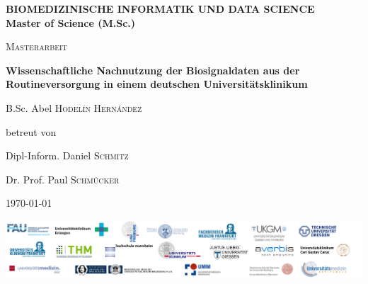 \begin{titlepage}
	\thispagestyle{firstpage}
	\raggedright
	{
		{\normalsize \color{orange} \bfseries BIOMEDIZINISCHE INFORMATIK UND DATA SCIENCE  \\}
		{\normalsize \color{gray} \bfseries Master of Science (M.Sc.)}
		\par
	}
	
	\vspace{1cm}
	
	\centering
	{\scshape\LARGE Masterarbeit \par}
	
	\vspace{1.5cm}
	{\huge \bfseries Wissenschaftliche Nachnutzung der Biosignaldaten aus der Routineversorgung in einem deutschen Universitätsklinikum \par}
	
	\vspace{2cm}
	{\Large B.Sc. Abel \textsc{Hodel\'in Hern\'andez}~\par}
	\vspace{2cm} 
	betreut von\par
	{Dipl-Inform. Daniel \textsc{Schmitz}\par}
	{Dr. Prof. Paul \textsc{Schmücker}\par}
	\vspace{2cm}

	{\large \today\par}
	
	\vfill
	
	\includegraphics[width=\textwidth]{figures/onder_document}
	
\end{titlepage}